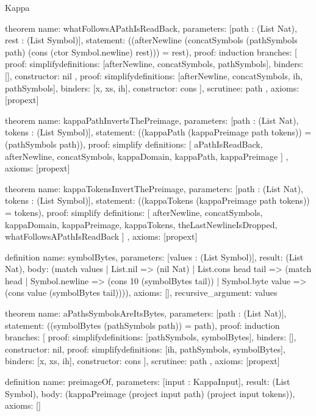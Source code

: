 \begin{lexlean}{Kappa}
\begin{semanticmodule}
theorem{
  name: whatFollowsAPathIsReadBack,
  parameters: [path : (List Nat), rest : (List Symbol)],
  statement: ((afterNewline (concatSymbols (pathSymbols path) (cons (ctor Symbol.newline) rest))) = rest),
  proof: induction{
    branches: [
      {
        proof: simplify{definitions: [afterNewline, concatSymbols, pathSymbols]},
        binders: [],
        constructor: nil
      },
      {
        proof: simplify{definitions: [afterNewline, concatSymbols, ih, pathSymbols]},
        binders: [x, xs, ih],
        constructor: cons
      }
    ],
    scrutinee: path
  },
  axioms: [propext]
}

theorem{
  name: kappaPathInvertsThePreimage,
  parameters: [path : (List Nat), tokens : (List Symbol)],
  statement: ((kappaPath (kappaPreimage path tokens)) = (pathSymbols path)),
  proof: simplify{
    definitions: [
      aPathIsReadBack,
      afterNewline,
      concatSymbols,
      kappaDomain,
      kappaPath,
      kappaPreimage
    ]
  },
  axioms: [propext]
}

theorem{
  name: kappaTokensInvertThePreimage,
  parameters: [path : (List Nat), tokens : (List Symbol)],
  statement: ((kappaTokens (kappaPreimage path tokens)) = tokens),
  proof: simplify{
    definitions: [
      afterNewline,
      concatSymbols,
      kappaDomain,
      kappaPreimage,
      kappaTokens,
      theLastNewlineIsDropped,
      whatFollowsAPathIsReadBack
    ]
  },
  axioms: [propext]
}

definition{
  name: symbolBytes,
  parameters: [values : (List Symbol)],
  result: (List Nat),
  body: (match values
    | List.nil => (nil Nat)
    | List.cons head tail => (match head
      | Symbol.newline => (cons 10 (symbolBytes tail))
      | Symbol.byte value => (cons value (symbolBytes tail)))),
  axioms: [],
  recursive_argument: values
}

theorem{
  name: aPathsSymbolsAreItsBytes,
  parameters: [path : (List Nat)],
  statement: ((symbolBytes (pathSymbols path)) = path),
  proof: induction{
    branches: [
      {proof: simplify{definitions: [pathSymbols, symbolBytes]}, binders: [], constructor: nil},
      {
        proof: simplify{definitions: [ih, pathSymbols, symbolBytes]},
        binders: [x, xs, ih],
        constructor: cons
      }
    ],
    scrutinee: path
  },
  axioms: [propext]
}

definition{
  name: preimageOf,
  parameters: [input : KappaInput],
  result: (List Symbol),
  body: (kappaPreimage (project input path) (project input tokens)),
  axioms: []
}


\end{semanticmodule}
\end{lexlean}

